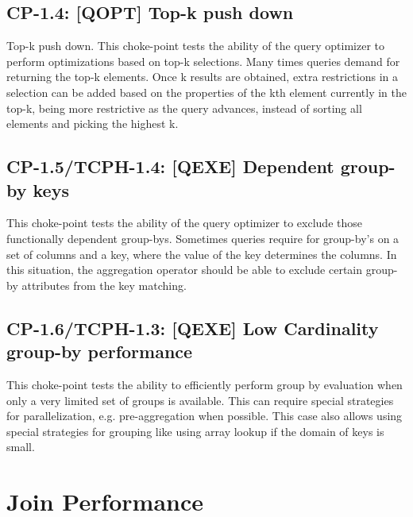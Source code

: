 

\subsection*{CP-1.4: [QOPT]  Top-k push down}
\label{choke_point_1.4}
Top-k push down. This choke-point tests the ability of the query optimizer to perform optimizations based on top-k selections. Many times queries demand for returning the top-k elements.
Once k results are obtained, extra restrictions in a selection can be added based on the properties of the kth element currently in the top-k, being more restrictive as the query advances, instead of sorting all elements and picking the highest k.



\subsection*{CP-1.5/TCPH-1.4: [QEXE] Dependent group-by keys}
\label{choke_point_1.5}
This choke-point tests the ability of the query optimizer to exclude those functionally dependent group-bys. Sometimes queries require for group-by's on a set of columns and a key, where the value of the key determines the columns.
In this situation, the aggregation operator should be able to exclude certain group-by attributes from the key matching.




\subsection*{CP-1.6/TCPH-1.3: [QEXE] Low Cardinality group-by performance}
\label{choke_point_1.6}
This choke-point tests the ability to efficiently perform group by evaluation when only a very limited set of groups is available.  This can require special strategies for parallelization, e.g. pre-aggregation when possible. This case also allows using special strategies for grouping like using array lookup if the domain of keys is small.




\section{Join Performance}

